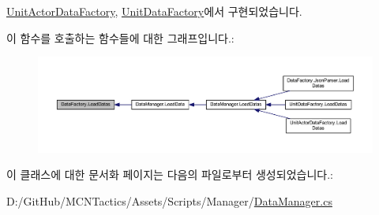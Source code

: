 \hyperlink{class_unit_actor_data_factory_af2d10cba13fca1669a50705e828cd475}{Unit\+Actor\+Data\+Factory}, \hyperlink{class_unit_data_factory_a048e5ca3d28d88eddf55537a4930f1df}{Unit\+Data\+Factory}에서 구현되었습니다.



이 함수를 호출하는 함수들에 대한 그래프입니다.\+:
\nopagebreak
\begin{figure}[H]
\begin{center}
\leavevmode
\includegraphics[width=350pt]{class_data_factory_a8ed29ae4a917c15aa824bb7f56418cbf_icgraph}
\end{center}
\end{figure}




이 클래스에 대한 문서화 페이지는 다음의 파일로부터 생성되었습니다.\+:\begin{DoxyCompactItemize}
\item 
D\+:/\+Git\+Hub/\+M\+C\+N\+Tactics/\+Assets/\+Scripts/\+Manager/\hyperlink{_data_manager_8cs}{Data\+Manager.\+cs}\end{DoxyCompactItemize}
